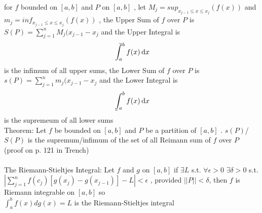 \documentclass[12pt]{article}
\def\upint{\mathchoice%
    {\mkern13mu\overline{\vphantom{\intop}\mkern7mu}\mkern-20mu}%
    {\mkern7mu\overline{\vphantom{\intop}\mkern7mu}\mkern-14mu}%
    {\mkern7mu\overline{\vphantom{\intop}\mkern7mu}\mkern-14mu}%
    {\mkern7mu\overline{\vphantom{\intop}\mkern7mu}\mkern-14mu}%
  \int}
\def\lowint{\mkern3mu\underline{\vphantom{\intop}\mkern7mu}\mkern-10mu\int}
\begin{document}
for $f$ bounded on $[a,b]$ and $P$ on $[a,b]$ , let $M_{j} = sup_{x_{j-1} \le x \le x_{j}}(f(x))$ and $m_{j} = inf_{x_{j-1} \le x \le x_{j}}(f(x))$ , the Upper Sum of $f$ over $P$ is $S(P) = \sum_{j=1}^{n}M_{j}(x_{j-1} - x_{j}$ and the Upper Integral is
\begin{gather*}
   \upint_a^b f(x)\,\mathrm{d}x 
\end{gather*} 
is the infimum of all upper sums, the Lower Sum of $f$ over $P$ is $s(P) = \sum_{j=1}^{n}m_{j}(x_{j-1} - x_{j}$ and the Lower Integral is 
\begin{gather*}
   \lowint_a^b f(x)\,\mathrm{d}x
\end{gather*} 
is the supremeum of all lower sums\\
Theorem: Let $f$ be bounded on $[a,b]$ and $P$ be a partition of $[a,b]$ . $s(P)$/$S(P)$ is the supremum/infimum of the set of all Reimann sum of $f$ over $P$ (proof on p. 121 in Trench)\\
\\
The Riemann-Stieltjes Integral: Let $f$ and $g$ on $[a,b]$ if $\exists L$ s.t. $\forall \epsilon > 0$ $\exists \delta > 0$ s.t. $|\sum_{j=1}^{n}f(c_{j})[g(x_{j}) - g(x_{j-1})] - L| < \epsilon$ , provided $||P|| < \delta$, then $f$ is Riemann integrable on $[a,b]$ so \\
$\int_{a}^{b}f(x)dg(x) = L$ is the Riemann-Stieltjes integral
\end{document}
